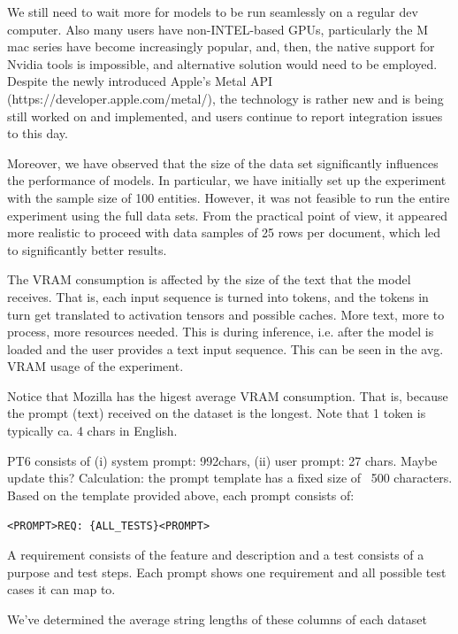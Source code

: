 \documentclass[conference]{IEEEtran}
\begin{document}
We still need to wait more for models to be run seamlessly on a regular dev computer. Also many users have non-INTEL-based GPUs, particularly the M mac series have become increasingly popular, and, then, the native support for Nvidia tools is impossible, and alternative solution would need to be employed. Despite the newly introduced Apple's Metal API (https://developer.apple.com/metal/), the technology is rather new and is being still worked on and implemented, and users continue to report integration issues to this day.


Moreover, we have observed that the size of the data set significantly influences the performance of models. In particular, we have initially set up the experiment with the sample size of 100 entities. However, it was not feasible to run the entire experiment using the full data sets. From the practical point of view, it appeared more realistic to proceed with data samples of 25 rows per document, which led to significantly better results.


The VRAM consumption is affected by the size of the text that the model receives. That is, each input sequence is turned into tokens, and the tokens in turn get translated to activation tensors and possible caches. More text, more to process, more resources needed. This is during inference, i.e. after the model is loaded and the user provides a text input sequence. This can be seen in the avg. VRAM usage of the experiment.

Notice that Mozilla has the higest average VRAM consumption. That is, because the prompt (text) received on the dataset is the longest. Note that 1 token is typically ca. 4 chars in English.

PT6 consists of (i) system prompt: 992chars, (ii) user prompt: 27 chars. Maybe update this?
Calculation: the prompt template has a fixed size of ~500 characters. Based on the template provided above, each prompt consists of:

\verb"<PROMPT>REQ: {ALL_TESTS}<PROMPT>"

A requirement consists of the feature and description and a test consists of a purpose and test steps. Each prompt shows one requirement and all possible test cases it can map to.

We've determined the average string lengths of these columns of each dataset
\end{document}
